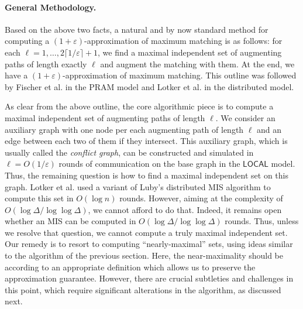 \documentclass[11pt]{article}
\newcommand{\eps}{\varepsilon}
\begin{document}
\paragraph{General Methodology.} Based on the above two facts, a natural and by now standard method for computing a $(1+\eps)$-approximation of maximum matching is as follows: for each $\ell =1, \dots, 2\lceil{1/\eps}\rceil+1$, we find a maximal independent set of augmenting paths of length exactly $\ell$ and augment the matching with them. At the end, we have a $(1+\eps)$-approximation of maximum matching. This outline was followed by Fischer et al.\cite{fischer1993approximating} in the PRAM model and Lotker et al.\cite{lotkerMatchingImproved} in the distributed model.

As clear from the above outline, the core algorithmic piece is to compute a maximal independent set of augmenting paths of length $\ell$. We consider an auxiliary graph with one node per each augmenting path of length $\ell$ and an edge between each two of them if they intersect. This auxiliary graph, which is usually called the \emph{conflict graph}, can be constructed and simulated in $\ell = O(1/\eps)$ rounds of communication on the base graph in the $\mathsf{LOCAL}$ model. Thus, the remaining question is how to find a maximal independent set on this graph. Lotker et al.\cite{lotkerMatchingImproved} used a variant of Luby's distributed MIS algorithm\cite{luby1986simple} to compute this set in $O(\log n)$ rounds. However, aiming at the complexity of $O(\log \Delta/\log\log \Delta)$, we cannot afford to do that. Indeed, it remains open whether an MIS can be computed in $O(\log \Delta/\log\log \Delta)$ rounds. Thus, unless we resolve that question, we cannot compute a truly maximal independent set. Our remedy is to resort to computing ``nearly-maximal'' sets, using ideas similar to the algorithm of the previous section. Here, the near-maximality should be according to an appropriate definition which allows us to preserve the approximation guarantee. However, there are crucial subtleties and challenges in this point, which require significant alterations in the algorithm, as discussed next.
\end{document}
